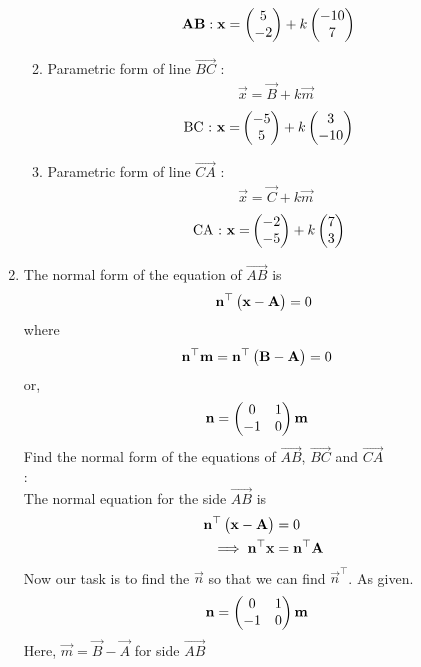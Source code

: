 \documentclass[10pt]{book}
\begin{document}
\begin{enumerate}[label=\thesection.\arabic*.,ref=\thesection.\theenumi]
\begin{enumerate}
\begin{align}
\mathbf{AB} : \mathbf{x} &= \begin{pmatrix}5\\-2\end{pmatrix} + k\begin{pmatrix}-10\\7\end{pmatrix}
\end{align}
\item Parametric form of line $\vec{BC}$ :
\begin{align}
\vec{x} = \vec{B} + k\vec{m}
\end{align}
\begin{align}
\text{BC : } \mathbf{x} =& \begin{pmatrix}-5\\5\end{pmatrix} + k\begin{pmatrix}3\\-10\end{pmatrix}
\end{align}
\item Parametric form of line $\vec{CA}$ :
\begin{align}
\vec{x} = \vec{C}+ k\vec{m}
\end{align}
\begin{align}
\text{CA : } \mathbf{x} =& \begin{pmatrix}-2\\-5\end{pmatrix} + k\begin{pmatrix}7\\3\end{pmatrix}
\end{align}
\end{enumerate}
 \item The normal form of the equation of $\vec{AB}$ is
\begin{align}
\mathbf{n}^{\top}\begin{pmatrix}\mathbf{x}-\mathbf{A}\end{pmatrix}=0
\end{align}
where
\begin{align}
\mathbf{n}^{\top}\mathbf{m}&=\mathbf{n}^{\top}\begin{pmatrix}\mathbf{B}-\mathbf{A}\end{pmatrix}=0
\end{align} 
or,\begin{align}
\mathbf{n}&=\begin{pmatrix}0 &1 \\-1 & 0\end{pmatrix}\mathbf{m}
\end{align}
Find the normal form of the equations of $\vec{AB}$, $\vec{BC}$ and $\vec{CA}$\\
\solution:\\
       The normal equation for the side $\vec{AB}$ is
\begin{align}
\mathbf{n}^{\top}\begin{pmatrix}\mathbf{x}-\mathbf{A}\end{pmatrix}&=0\\
\implies
\mathbf{n}^{\top}\mathbf{x}&=\mathbf{n}^{\top}\mathbf{A}
\end{align}
Now our task is to find the $\vec{n}$ so that we can find $\vec{n}^{\top}$.
As given. 
\begin{align}
  \mathbf{n} &= \begin{pmatrix}0 & 1\\
  -1 & 0\end{pmatrix}\mathbf{m}
\end{align}
Here, $\vec{m} = \vec{B}- \vec{A}$ for side $\vec{AB}$
\begin{align}

\end{align}
\end{enumerate}
\end{document}
